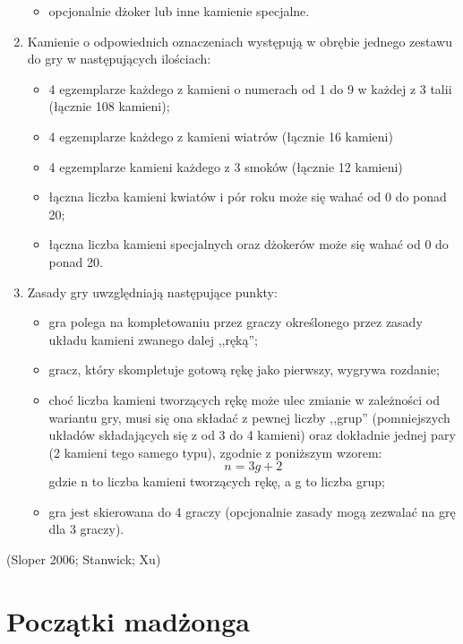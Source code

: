\begin{enumerate}[label={\alph*)}]
\begin{itemize}
	  \item opcjonalnie dżoker lub inne kamienie specjalne.
	\end{itemize}
\item Kamienie o odpowiednich oznaczeniach występują w obrębie jednego zestawu
do gry w następujących ilościach:
	\begin{itemize}
	  \item 4 egzemplarze każdego z kamieni o numerach od 1 do 9 w każdej z 3 talii
	  (łącznie 108 kamieni);
	  \item 4 egzemplarze każdego z kamieni wiatrów (łącznie 16 kamieni)
	  \item 4 egzemplarze kamieni każdego z 3 smoków (łącznie 12 kamieni)
	  \item łączna liczba kamieni kwiatów i pór roku może się wahać od 0 do ponad
	  20;
	  \item łączna liczba kamieni specjalnych oraz dżokerów może się wahać od
	0 do ponad 20.
	\end{itemize} 
\item Zasady gry uwzględniają następujące punkty:
	\begin{itemize}
	  \item gra polega na kompletowaniu przez graczy określonego przez zasady
	  układu kamieni zwanego dalej ,,ręką'';
	  \item gracz, który skompletuje gotową rękę jako pierwszy, wygrywa rozdanie;
	  \item choć liczba kamieni tworzących rękę może ulec zmianie w zależności od
	  wariantu gry, musi się ona składać z pewnej liczby ,,grup'' (pomniejszych
	  układów składających się z od 3 do 4 kamieni) oraz dokładnie jednej pary (2
	  kamieni tego samego typu), zgodnie z poniższym wzorem:
	  \begin{equation*}
	  n = 3g + 2
	  \end{equation*}
	  gdzie n to liczba kamieni tworzących rękę, a g to liczba grup;
	  \item gra jest skierowana do 4 graczy (opcjonalnie zasady mogą
	  zezwalać na grę dla 3 graczy).
	\end{itemize} 
\end{enumerate}
(Sloper 2006; Stanwick; Xu)
\section{Początki madżonga}
